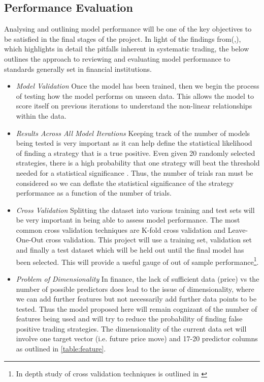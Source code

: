 \documentclass[12pt, a4paper]{article}
\begin{document}
\subsection{Performance Evaluation}
Analysing and outlining model performance will be one of the key objectives to be satisfied in the final stages of the project.
In light of the findings from(\cite{Arnott2018},\cite{Bailey2013}), which highlights in detail the pitfalls inherent in systematic trading, the below outlines the approach to reviewing and evaluating model performance to standards generally set in financial institutions.
\begin{itemize}
\item \textit{Model Validation} \newline 
Once the model has been trained, then we begin the process of testing how the model performs on unseen data. This allows the model to score itself on previous iterations to understand the non-linear relationships within the data.
\item \textit{Results Across All Model Iterations} \newline Keeping track of the number of models being tested is very important as it can help define the statistical likelihood of finding a strategy that is a true positive. Even given 20 randomly selected strategies, there is a high probability that one strategy will beat the threshold needed for a statistical significance \cite{Arnott2018}. Thus, the number of trials ran must be considered so we can deflate the statistical significance of the strategy performance as a function of the number of trials\cite{Bailey2011}.
\item \textit{Cross Validation} \newline Splitting the dataset into various training and test sets will be very important in being able to assess model performance. The most common cross validation techniques are K-fold cross validation and Leave-One-Out cross validation. This project will use a training set, validation set and finally a test dataset which will be held out until the final model has been selected. This will provide a useful gauge of out of sample performance\footnote{In depth study of cross validation techniques is outlined in \cite{Bergmeir2012}}.
\item \textit{Problem of Dimensionality} \newline In finance, the lack of sufficient data (price) vs the number of possible predictors does lead to the issue of dimensionality, where we can add further features but not necessarily add further data points to be tested. Thus the model proposed here will remain cognizant of the number of features being used and will try to reduce the probability of finding false positive trading strategies. The dimensionality of the current data set will involve one target vector (i.e. future price move) and 17-20 predictor columns as outlined in \ref{table:feature}.

\end{itemize}
\end{document}
